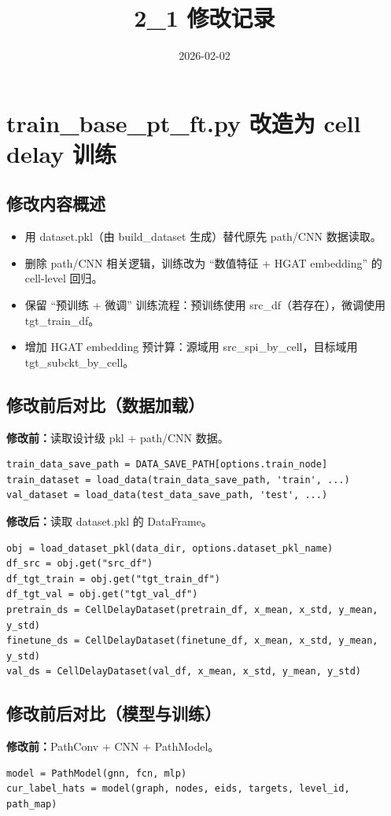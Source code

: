 \documentclass{ctexart}
\title{2\_1 修改记录}
\date{2026-02-02}
\begin{document}
\maketitle

\section{train\_base\_pt\_ft.py 改造为 cell delay 训练}
\subsection{修改内容概述}
\begin{itemize}
  \item 用 dataset.pkl（由 build\_dataset 生成）替代原先 path/CNN 数据读取。
  \item 删除 path/CNN 相关逻辑，训练改为 ``数值特征 + HGAT embedding'' 的 cell-level 回归。
  \item 保留 ``预训练 + 微调'' 训练流程：预训练使用 src\_df（若存在），微调使用 tgt\_train\_df。
  \item 增加 HGAT embedding 预计算：源域用 src\_spi\_by\_cell，目标域用 tgt\_subckt\_by\_cell。
\end{itemize}

\subsection{修改前后对比（数据加载）}
\textbf{修改前：}读取设计级 pkl + path/CNN 数据。
\begin{lstlisting}
train_data_save_path = DATA_SAVE_PATH[options.train_node]
train_dataset = load_data(train_data_save_path, 'train', ...)
val_dataset = load_data(test_data_save_path, 'test', ...)
\end{lstlisting}

\textbf{修改后：}读取 dataset.pkl 的 DataFrame。
\begin{lstlisting}
obj = load_dataset_pkl(data_dir, options.dataset_pkl_name)
df_src = obj.get("src_df")
df_tgt_train = obj.get("tgt_train_df")
df_tgt_val = obj.get("tgt_val_df")
pretrain_ds = CellDelayDataset(pretrain_df, x_mean, x_std, y_mean, y_std)
finetune_ds = CellDelayDataset(finetune_df, x_mean, x_std, y_mean, y_std)
val_ds = CellDelayDataset(val_df, x_mean, x_std, y_mean, y_std)
\end{lstlisting}

\subsection{修改前后对比（模型与训练）}
\textbf{修改前：}PathConv + CNN + PathModel。
\begin{lstlisting}
model = PathModel(gnn, fcn, mlp)
cur_label_hats = model(graph, nodes, eids, targets, level_id, path_map)
\end{lstlisting}
\end{document}
